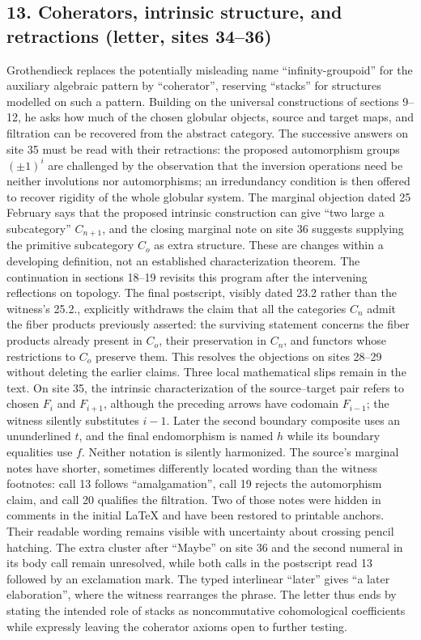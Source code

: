 \subsection*{13. Coherators, intrinsic structure, and retractions (letter, sites 34--36)}
Grothendieck replaces the potentially misleading name ``infinity-groupoid'' for the auxiliary algebraic pattern by ``coherator'', reserving ``stacks'' for structures modelled on such a pattern. Building on the universal constructions of sections 9--12, he asks how much of the chosen globular objects, source and target maps, and filtration can be recovered from the abstract category. The successive answers on site 35 must be read with their retractions: the proposed automorphism groups $(\pm1)^i$ are challenged by the observation that the inversion operations need be neither involutions nor automorphisms; an irredundancy condition is then offered to recover rigidity of the whole globular system. The marginal objection dated 25 February says that the proposed intrinsic construction can give ``two large a subcategory'' $C_{n+1}$, and the closing marginal note on site 36 suggests supplying the primitive subcategory $C_o$ as extra structure. These are changes within a developing definition, not an established characterization theorem. The continuation in sections 18--19 revisits this program after the intervening reflections on topology. The final postscript, visibly dated 23.2 rather than the witness's 25.2., explicitly withdraws the claim that all the categories $C_n$ admit the fiber products previously asserted: the surviving statement concerns the fiber products already present in $C_o$, their preservation in $C_n$, and functors whose restrictions to $C_o$ preserve them. This resolves the objections on sites 28--29 without deleting the earlier claims. Three local mathematical slips remain in the text. On site 35, the intrinsic characterization of the source--target pair refers to chosen $F_i$ and $F_{i+1}$, although the preceding arrows have codomain $F_{i-1}$; the witness silently substitutes $i-1$. Later the second boundary composite uses an ununderlined $t$, and the final endomorphism is named $h$ while its boundary equalities use $f$. Neither notation is silently harmonized. The source's marginal notes have shorter, sometimes differently located wording than the witness footnotes: call 13 follows ``amalgamation'', call 19 rejects the automorphism claim, and call 20 qualifies the filtration. Two of those notes were hidden in comments in the initial LaTeX and have been restored to printable anchors. Their readable wording remains visible with uncertainty about crossing pencil hatching. The extra cluster after ``Maybe'' on site 36 and the second numeral in its body call remain unresolved, while both calls in the postscript read 13 followed by an exclamation mark. The typed interlinear ``later'' gives ``a later elaboration'', where the witness rearranges the phrase. The letter thus ends by stating the intended role of stacks as noncommutative cohomological coefficients while expressly leaving the coherator axioms open to further testing.
